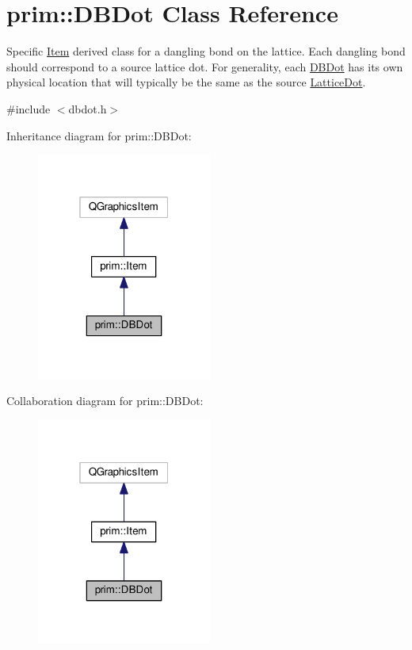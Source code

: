 \hypertarget{classprim_1_1DBDot}{}\section{prim\+:\+:D\+B\+Dot Class Reference}
\label{classprim_1_1DBDot}


Specific \hyperlink{classprim_1_1Item}{Item} derived class for a dangling bond on the lattice. Each dangling bond should correspond to a source lattice dot. For generality, each \hyperlink{classprim_1_1DBDot}{D\+B\+Dot} has its own physical location that will typically be the same as the source \hyperlink{classprim_1_1LatticeDot}{Lattice\+Dot}.  




{\ttfamily \#include $<$dbdot.\+h$>$}



Inheritance diagram for prim\+:\+:D\+B\+Dot\+:\nopagebreak
\begin{figure}[H]
\begin{center}
\leavevmode
\includegraphics[width=163pt]{classprim_1_1DBDot__inherit__graph}
\end{center}
\end{figure}


Collaboration diagram for prim\+:\+:D\+B\+Dot\+:\nopagebreak
\begin{figure}[H]
\begin{center}
\leavevmode
\includegraphics[width=163pt]{classprim_1_1DBDot__coll__graph}
\end{center}
\end{figure}
